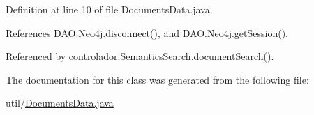 Definition at line 10 of file Documents\+Data.\+java.



References D\+A\+O.\+Neo4j.\+disconnect(), and D\+A\+O.\+Neo4j.\+get\+Session().



Referenced by controlador.\+Semantics\+Search.\+document\+Search().



The documentation for this class was generated from the following file\+:\begin{DoxyCompactItemize}
\item 
util/\hyperlink{DocumentsData_8java}{Documents\+Data.\+java}\end{DoxyCompactItemize}
